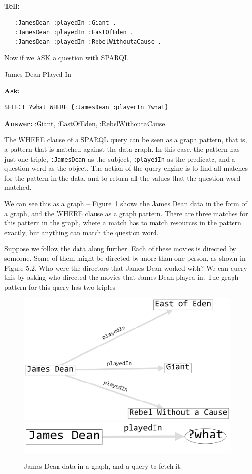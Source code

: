 \textbf{Tell:}
\begin{lstlisting}
   :JamesDean :playedIn :Giant .
   :JamesDean :playedIn :EastOfEden .
   :JamesDean :playedIn :RebelWithoutaCause .
\end{lstlisting}


Now if we ASK a question with SPARQL
\begin{query}James Dean Played In\end{query}

\textbf{\textbf{Ask:}} 
\begin{lstlisting}
SELECT ?what WHERE {:JamesDean :playedIn ?what}
\end{lstlisting}
\textbf{\textbf{Answer:}} :Giant, :EastOfEden, :RebelWithoutaCause.

The WHERE clause of a SPARQL query can be seen as a graph pattern, that
is, a pattern that is matched against the data graph. In this case, the
pattern has just one triple, \texttt{:JamesDean} as the subject, \texttt{:playedIn} as the
predicate, and a question word as the object. The action of the query
engine is to find all matches for the pattern in the data, and to return
all the values that the question word matched.

We can see this as a graph -- Figure~\ref{fig:ch06.1} shows the James Dean data in
the form of a graph, and the WHERE clause as a graph pattern. There are
three matches for this pattern in the graph, where a match has to match
resources in the pattern exactly, but anything can match the question
word.

Suppose we follow the data along further. Each of these movies is
directed by someone. Some of them might be directed by more than one
person, as shown in Figure 5.2. Who were the directors that
James Dean worked with? We can query this by asking who directed the
movies that James Dean played in. The graph pattern for this query has
two triples:

\begin{figure}
\centering
\includegraphics[width=5in]{SWWOv3/media/ch6/figure6-1a.png}
\includegraphics[width=5in]{SWWOv3/media/ch6/figure6-1b.png}
\caption{James Dean data in a graph, and a query to fetch it.}
\label{fig:ch06.1}
\end{figure}

